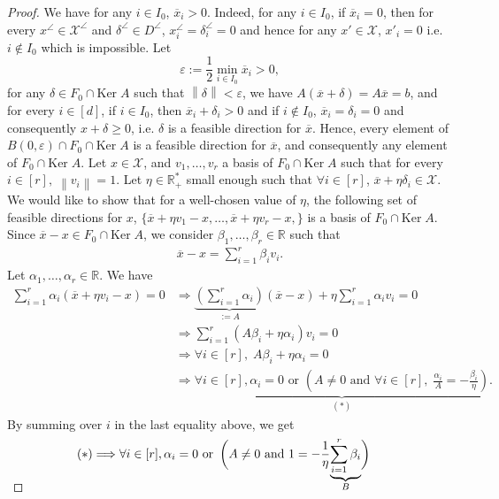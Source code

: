\documentclass[10pt,a4paper]{amsart}
\newcommand{\Ker}[0]{\mathrm{Ker}\;}
\newcommand{\R}[0]{\mathbb R}
\newcommand{\cX}{\mathcal{X}}
\newcommand{\norm}[1]{\left\lVert#1\right\rVert}
\begin{document}
\begin{proof}
        We have for any $i\in I_0$, $\overline{x}_i>0$. Indeed, for any $i\in I_0$, if $\overline{x}_i=0$, then for every $x^\angle \in \cX^\angle$ and $\delta^\angle \in D^\angle$, $x_i^\angle=\delta_i^\angle =0$ and hence for any $x'\in \cX$, $x'_i=0$ i.e. $i\not \in I_0$ which is impossible. Let $$\varepsilon:=\frac{1}{2}\min_{i\in I_0}\overline{x}_i>0,$$ for any $\delta \in F_0 \cap \Ker A$ such that $\norm{\delta}<\varepsilon$, we have $A(\overline{x}+\delta)=A\overline{x}=b$, and for every $i\in [d]$, if $i\in I_0$, then $\overline{x}_i + \delta _i >0$ and if $i\not\in I_0$, $\overline{x}_i=\delta_i=0$ and consequently $x+\delta \geq 0$, i.e. $\delta$ is a feasible direction for $\overline{x}$. Hence, every element of $B(0,\varepsilon)\cap F_0 \cap \Ker A$ is a feasible direction for $\overline{x}$, and consequently any element of $F_0 \cap \Ker A$. Let $x\in \cX$, and $v_1,\dots, v_r$ a basis of $F_0\cap \Ker A$ such that for every $i\in [r],\; \norm{v_i}=1$. Let $\eta \in \R^*_+$ small enough such that $\forall i \in [r]$, $\overline{x} + \eta \delta _i \in \cX$. We would like to show that for a well-chosen value of $\eta$, the following set of feasible directions for $x$, $\{\overline{x}+\eta v_1 - x,\dots,\overline{x}+\eta v_r - x,\}$ is a basis of $F_0 \cap \Ker A$. Since $\overline{x}-x\in F_0 \cap \Ker A$, we consider $\beta_1,\dots,\beta_r\in \R$ such that 
        \begin{align*}
            \overline{x}-x=\sum_{i=1}^{r}\beta_i v_i.
        \end{align*}
        Let $\alpha_1,\dots,\alpha_r\in \R$. We have 
        \begin{align*}
            \sum_{i=1}^{r}\alpha_i(\overline{x}+\eta v_i-x)=0 &\Longrightarrow \underbrace{\left(\sum_{i=1}^{r}\alpha_i\right)}_{:=A}(\overline{x}-x)+\eta \sum_{i=1}^{r}\alpha_i v_i=0\\
            &\Longrightarrow \sum_{i=1}^{r}(A\beta_i + \eta \alpha_i)v_i=0\\
            &\Longrightarrow \forall i \in [r],\; A\beta_i + \eta \alpha_i=0\\
            &\Longrightarrow \underbrace{ \forall i\in [r], \alpha_i=0 \text{ or }\left( A\neq 0 \text{ and } \forall i \in [r],\;\frac{\alpha_i}{A}=-\frac{\beta_i}{\eta}\right)}_{(*)}.
        \end{align*}
        By summing over $i$ in the last equality above, we get
        \begin{align*}
            (*)&\Longrightarrow  \forall i\in [r], \alpha_i=0 \text{ or }\left( A\neq 0 \text{ and } 1=-\frac{1}{\eta}\smash{\underbrace{\sum_{i=1}^{r}\beta_i}_{B}} \right)
        \end{align*}
        

\end{proof}
\end{document}
